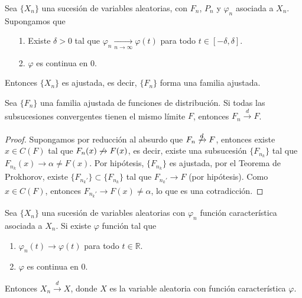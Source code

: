 \begin{cor} \label{cor1}
    Sea $\{X_n\}$ una sucesión de variables aleatorias, con $F_n$, $P_n$ y $\varphi_n$ asociada a $X_n$. Supongamos que
    \begin{enumerate}
        \item[1.] Existe $\delta > 0$ tal que $\varphi_n \xrightarrow[n \to \infty]{} \varphi(t)$ para todo $t \in [-\delta,\delta]$.
        \item[2.] $\varphi$ es continua en $0$.
    \end{enumerate}
    Entonces $\{X_n\}$ es ajustada, es decir, $\{F_n\}$ forma una familia ajustada.
\end{cor}

\begin{teo} \label{teo1}
    Sea $\{F_n\}$ una familia ajustada de funciones de distribución. Si todas las subsucesiones convergentes tienen el mismo límite $F$, entonces $F_n \xrightarrow[]{d} F$.
\end{teo}

\begin{proof}
    Supongamos por reducción al absurdo que $F_n \not \xrightarrow[]{d} F$, entonces existe $x \in C(F)$ tal que $F_n(x) \not \xrightarrow[]{} F(x)$, es decir, existe una subsucesión $\{F_{n_k}\}$ tal que $F_{n_k}(x) \xrightarrow[]{} \alpha \not = F(x)$. Por hipótesis, $\{F_{n_k}\}$ es ajustada, por el Teorema de Prokhorov, existe $\{F_{n_k'}\} \subset \{F_{n_k}\}$ tal que $F_{n_k'} \xrightarrow[]{} F$ (por hipótesis). Como $x \in C(F)$, entonces $F_{n_k'} \xrightarrow[]{} F(x) \not = \alpha$, lo que es una cotradicción. 
\end{proof}

\begin{teo}
    Sea $\{X_n\}$ una sucesión de variables aleatorias con $\varphi_n$ función característica asociada a $X_n$. Si existe $\varphi$ función tal que
    \begin{enumerate}
        \item $\varphi_n(t) \longrightarrow \varphi(t)$ para todo $t \in \mathbb{R}$.
        \item $\varphi$ es continua en $0$.
    \end{enumerate}
    Entonces $X_n \xrightarrow[]{d} X$, donde $X$ es la variable aleatoria con función característica $\varphi$.
\end{teo}

